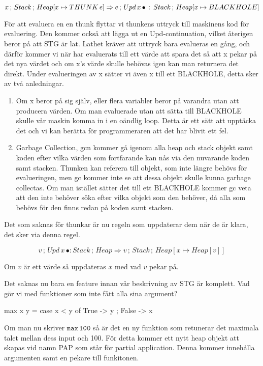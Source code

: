 \documentclass[../Core]{subfiles}
\begin{document}
\[
x\,;\, Stack\,;\, Heap[x\mapsto THUNK\,e]\Rightarrow e\,;\, Upd\, x\,\bullet\,:\, Stack\,;\, Heap[x\mapsto BLACKHOLE]\]


För att evaluera en en thunk flyttar vi thunkens uttryck till maskinens kod
för evaluering. Den kommer också att lägga ut en Upd-continuation, vilket
återigen beror på att STG är lat. Lathet kräver att uttryck bara evalueras
en gång, och därför kommer vi när  har evaluerats till ett värde att spara %
det så att x pekar på det nya värdet och om x's värde skulle behövas
igen kan man returnera det direkt. Under evalueringen av x sätter
vi även x till ett BLACKHOLE, detta sker av två anledningar. 
\begin{enumerate}
\item Om x beror på sig själv, eller flera variabler beror på varandra utan
att producera värden. Om man evaluerade utan att sätta till BLACKHOLE
skulle vår maskin komma in i en oändlig loop. Detta är ett sätt att
upptäcka det och vi kan berätta för programmeraren att det har blivit
ett fel.
\item Garbage Collection, gcn kommer gå igenom alla heap och stack objekt
samt koden efter vilka värden som fortfarande kan nås via den nuvarande
koden samt stacken. Thunken kan referera till objekt, som inte längre
behövs för evalueringen, men gc kommer inte se att dessa objekt skulle
kunna garbage collectas. Om man istället sätter det till ett BLACKHOLE
kommer gc veta att den inte behöver söka efter vilka objekt som den
behöver, då alla som behövs för den finns redan på koden samt stacken.
\end{enumerate}
Det som saknas för thunkar är nu regeln som uppdaterar dem när de
är klara, det sker via denna regel.

\[
v\,;\, Upd\, x\,\bullet:Stack\,;\, Heap\Rightarrow v\,;\, Stack\,;\, Heap[x\mapsto Heap[v]]\]


Om $v$ är ett värde så uppdateras $x$ med vad $v$ pekar på.

Det saknas nu bara en feature innan vår beskrivning av STG är komplett.
Vad gör vi med funktioner som inte fått alla sina argument? 

\begin{codeEx}
max x y = case x < y of
    { True  -> y
    ; False -> x
    }
\end{codeEx}

Om man nu skriver $\mathtt{max\,100}$ så är det en ny funktion som
retunerar det maximala talet mellan dess input och 100. För detta
kommer ett nytt heap objekt att skapas vid namn PAP som står för partial
application. Denna kommer innehålla argumenten samt en pekare till
funkitonen. 
\end{document}
